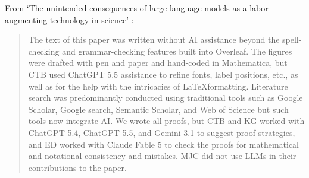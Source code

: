 \documentclass[11pt]{article}
\begin{document}
From \href{https://arxiv.org/pdf/2607.17397}{`The unintended consequences of large language models as a labor-augmenting technology in science'} :
\begin{quote}
The text of this paper was written without AI assistance beyond the spell-checking and grammar-checking features built into Overleaf. The figures were drafted with pen and paper and hand-coded in Mathematica, but CTB used ChatGPT 5.5 assistance to refine fonts, label positions, etc., as well as for the help with the intricacies of \LaTeX formatting. Literature search was predominantly conducted using traditional tools such as Google Scholar, Google search, Semantic Scholar, and Web of Science but such tools now integrate AI. We wrote all proofs, but CTB and KG worked with ChatGPT 5.4, ChatGPT 5.5, and Gemini 3.1 to suggest proof strategies, and ED worked with Claude Fable 5 to check the proofs for mathematical and notational consistency and mistakes. MJC did not use LLMs in their contributions to the paper.
\end{quote}
\end{document}
